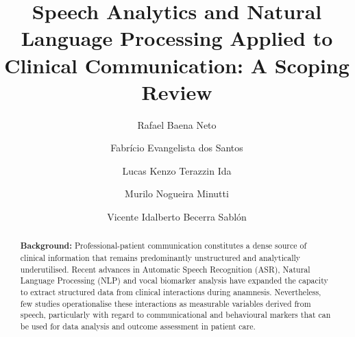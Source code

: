 \documentclass[review,12pt]{elsarticle}
\begin{document}
\begin{frontmatter}

\title{Speech Analytics and Natural Language Processing Applied to
Clinical Communication: A Scoping Review}

\author[usf1]{Rafael Baena Neto}

\author[usf2]{Fabrício Evangelista dos Santos}

\author[usf2]{Lucas Kenzo Terazzin Ida}

\author[usf2]{Murilo Nogueira Minutti}

\author[usf1]{Vicente Idalberto Becerra Sablón}


\address[usf1]{Graduate Program in Health Data Science, Universidade
São Francisco (USF), Rua Alexandre Rodrigues Barbosa, 45, Bragança
Paulista, SP, 12916-900, Brazil}
\address[usf2]{Department of Computer Engineering, Universidade São
Francisco (USF), Rua Alexandre Rodrigues Barbosa, 45, Bragança
Paulista, SP, 12916-900, Brazil}

\begin{abstract}
\textbf{Background:}
Professional-patient communication constitutes a dense source of clinical
information that remains predominantly unstructured and analytically
underutilised. Recent advances in Automatic Speech Recognition (ASR),
Natural Language Processing (NLP) and vocal biomarker analysis have expanded
the capacity to extract structured data from clinical interactions during
anamnesis. Nevertheless, few studies operationalise these interactions as
measurable variables derived from speech, particularly with regard to
communicational and behavioural markers that can be used for data analysis
and outcome assessment in patient care.


\end{abstract}
\end{frontmatter}
\end{document}
